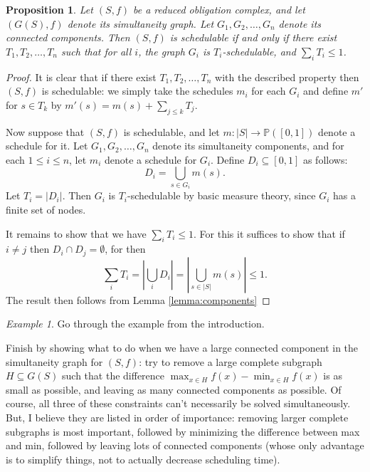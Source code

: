 \documentclass{amsart}
\def\PP{{\mathbb P}}
\def\to{\rightarrow}
\def\taking{\colon}
\def\ss{\subseteq}
\newtheorem{proposition}[theorem]{Proposition}
\theoremstyle{remark}
\newtheorem{example}[theorem]{Example}
\theoremstyle{definition}
\begin{document}
\begin{proposition}

Let $(S,f)$ be a reduced obligation complex, and let $(G(S),f)$ denote its simultaneity graph. Let $G_1,G_2,\ldots, G_n$ denote its connected components. Then $(S,f)$ is schedulable if and only if there exist $T_1,T_2,\ldots, T_n$ such that for all $i$, the graph $G_i$ is $T_i$-schedulable, and $\sum_i T_i\leq 1$.

\end{proposition}

\begin{proof}

It is clear that if there exist $T_1,T_2,\ldots, T_n$ with the described property then $(S,f)$ is schedulable: we simply take the schedules $m_i$ for each $G_i$ and define $m'$ for $s\in T_k$ by $m'(s)=m(s)+\sum_{j\leq k}T_j$.

Now suppose that $(S,f)$ is schedulable, and let $m\taking|S|\to\PP([0,1])$ denote a schedule for it. Let $G_1,G_2,\ldots, G_n$ denote its simultaneity components, and for each $1\leq i\leq n$, let $m_i$ denote a schedule for $G_i$. Define $D_i\ss[0,1]$ as follows: $$D_i=\bigcup_{s\in G_i}m(s).$$ Let $T_i=|D_i|$. Then $G_i$ is $T_i$-schedulable by basic measure theory, since $G_i$ has a finite set of nodes. 

It remains to show that we have $\sum_iT_i\leq 1$. For this it suffices to show that if $i\neq j$ then $D_i\cap D_j=\emptyset$, for then $$\sum_iT_i=\left|\bigcup_iD_i\right|=\left|\bigcup_{s\in|S|}m(s)\right|\leq 1.$$ The result then follows from Lemma \ref{lemma:components}

\end{proof}

\begin{example}

Go through the example from the introduction.

\end{example}

Finish by showing what to do when we have a large connected component in the simultaneity graph for $(S,f)$: try to remove a large complete subgraph $H\ss G(S)$ such that the difference $\max_{x\in H}f(x)-\min_{x\in H}f(x)$ is as small as possible, and leaving as many connected components as possible. Of course, all three of these constraints can't necessarily be solved simultaneously. But, I believe they are listed in order of importance: removing larger complete subgraphs is most important, followed by minimizing the difference between max and min, followed by leaving lots of connected components (whose only advantage is to simplify things, not to actually decrease scheduling time).
\end{document}
